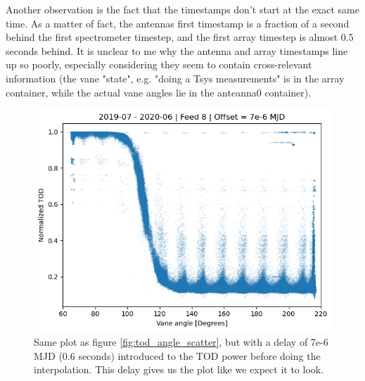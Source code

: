 \documentclass[10pt, a4paper]{article}
\begin{document}
Another observation is the fact that the timestamps don't start at the exact same time. As a matter of fact, the antennas first timestamp is a fraction of a second behind the first spectrometer timestep, and the first array timestep is almost 0.5 seconds behind. It is unclear to me why the antenna and array timestamps line up so poorly, especially considering they seem to contain cross-relevant information (the vane "state", e.g. "doing a Tsys measurements" is in the array container, while the actual vane angles lie in the anteanna0 container).

\begin{figure}[H]
    \centering
    \includegraphics[scale=0.6]{../plots/power_angle_all_7e-6.png}
    \caption{Same plot as figure \ref{fig:tod_angle_scatter}, but with a delay of 7e-6 MJD (0.6 seconds) introduced to the TOD power before doing the interpolation. This delay gives us the plot like we expect it to look.}
    \label{fig:tod_angle_scatter_offset}
\end{figure}
\end{document}
